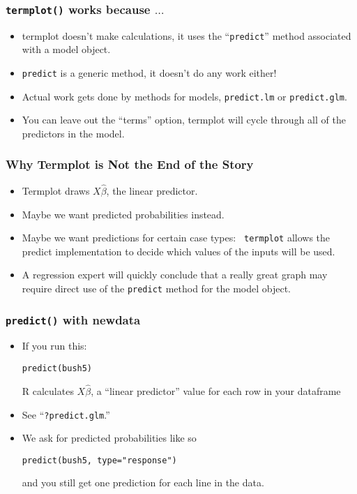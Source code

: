 \documentclass[10pt,english]{beamer}
\begin{document}
\begin{frame}[containsverbatim]
  \frametitle{\texttt{termplot()} works because $\ldots$}

  \begin{itemize}
  \item termplot doesn't make calculations, it uses the
    ``\texttt{predict}'' method associated with a model object.
  \item \texttt{predict} is a generic method, it doesn't do any work either!
  \item Actual work gets done by methods for models,
    \texttt{predict.lm} or  \texttt{predict.glm}.
  \item You can leave out the ``terms'' option, termplot will
    cycle through all of the predictors in the model.
  \end{itemize}
\end{frame}

\begin{frame}[containsverbatim]
  \frametitle {Why Termplot is Not the End of the Story}
  \begin{itemize}
  \item Termplot draws $X\hat{\beta}$, the linear predictor.
  \item Maybe we want predicted probabilities instead.
  \item Maybe we want predictions for certain case types: \texttt{ termplot} allows the predict implementation to decide which
    values of the inputs will be used.
  \item A regression expert will quickly conclude that a really
    great graph may require direct use of the \texttt{predict}
    method for the model object.
  \end{itemize}
\end{frame}



\begin{frame}
  \frametitle{\texttt{predict()} with newdata}

  \begin{itemize}
    \item If you run this:

      \texttt{predict(bush5)}

    R calculates $X\hat{\beta}$, a ``linear predictor'' value for each row in your dataframe

  \item See ``\texttt{?predict.glm}.''

  \item We ask for predicted probabilities like so

    \texttt{predict(bush5, type="response")}

    and you still get one prediction for each line in the data.
  \end{itemize}
\end{frame}
\end{document}
